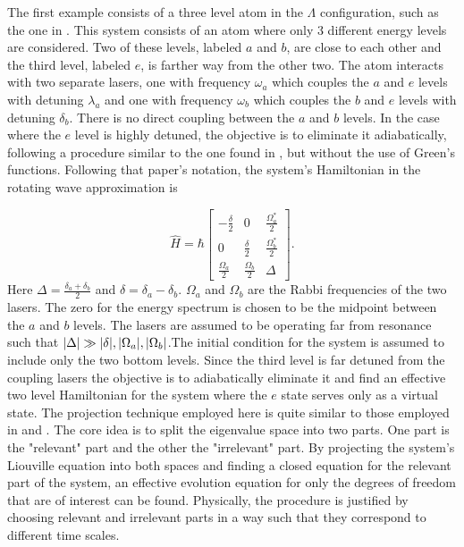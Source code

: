 \documentclass[12pt]{article}
\begin{document}
The first example consists of a three level atom in the $\Lambda$ configuration, such as the one in \cite{Ying3LevelAtom1996}. This system consists of an atom where only 3 different energy levels are considered. Two of these levels, labeled $a$ and $b$, are close to each other and the third level, labeled $e$, is farther way from the other two. The atom interacts with two separate lasers, one with frequency $\omega_a$ which couples the $a$ and $e$ levels with detuning $\lambda_a$ and one with frequency $\omega_b$ which couples the $b$ and $e$ levels with detuning $\delta_b$. There is no direct coupling between the $a$ and $b$ levels. In the case where the $e$ level is highly detuned, the objective is to eliminate it adiabatically, following a procedure similar to the one found in \cite{BrionAdiabatic2006}, but without the use of Green's functions. Following that paper's notation,  the system's Hamiltonian in the rotating wave approximation is

\begin{equation}\label{eq:Lambda_Hamiltonian}
    \widehat{H}=\hbar\left[\begin{array}{ccc}
-\frac{\delta}{2} & 0 & \frac{\Omega_{a}^{*}}{2} \\
0 & \frac{\delta}{2} & \frac{\Omega_{b}^{*}}{2} \\
\frac{\Omega_{a}}{2} & \frac{\Omega_{b}}{2} & \Delta
\end{array}\right].
\end{equation} Here $\Delta = \frac{\delta_a+\delta_b}{2}$ and $\delta = \delta_a-\delta_b$. $\Omega_a$ and $\Omega_b$ are the Rabbi frequencies of the two lasers. The zero for the energy spectrum is chosen to be the midpoint between the $a$ and $b$ levels. The lasers are assumed to be operating far from resonance such that $\abs{\Delta} \gg \abs{\delta},\abs{\Omega_a}, \abs{\Omega_b}$.The initial condition for the system is assumed to include only the two bottom levels. Since the third level is far detuned from the coupling lasers the objective is to adiabatically eliminate it and find an effective two level Hamiltonian for the system where the $e$ state serves only as a virtual state\cite{Gerry3LA1990}. The projection technique employed here is quite similar to those employed in \cite{NakajimaProyectors1958} and \cite{ZwanzigProyectors1960}. The core idea is to split the eigenvalue space into two parts. One part is the "relevant" part and the other the "irrelevant" part. By projecting the system's Liouville equation into both spaces and finding a closed equation for the relevant part of the system, an effective evolution equation for only the degrees of freedom that are of interest can be found. Physically, the procedure is justified by choosing relevant and irrelevant parts in a way such that they correspond to different time scales.
\end{document}
